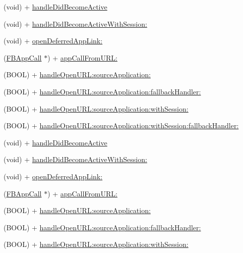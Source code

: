 \begin{DoxyCompactItemize}
\item 
(void) + \hyperlink{interfaceFBAppCall_ae38f6595e03e0ba2c44670e7ff579a70}{handle\+Did\+Become\+Active}
\item 
(void) + \hyperlink{interfaceFBAppCall_aa00467d180eab724577daeeb205524a4}{handle\+Did\+Become\+Active\+With\+Session\+:}
\item 
(void) + \hyperlink{interfaceFBAppCall_a02498c71e0be169b1ae49136d1446a23}{open\+Deferred\+App\+Link\+:}
\item 
(\hyperlink{interfaceFBAppCall}{F\+B\+App\+Call} $\ast$) + \hyperlink{interfaceFBAppCall_a03baee771317510fb167dad8926bc176}{app\+Call\+From\+U\+R\+L\+:}
\item 
(B\+O\+OL) + \hyperlink{interfaceFBAppCall_a199dea04bcd5f045d222a0c98901a3b9}{handle\+Open\+U\+R\+L\+:source\+Application\+:}
\item 
(B\+O\+OL) + \hyperlink{interfaceFBAppCall_ad685be8d03104cb8aa1f2b6ccf770d5d}{handle\+Open\+U\+R\+L\+:source\+Application\+:fallback\+Handler\+:}
\item 
(B\+O\+OL) + \hyperlink{interfaceFBAppCall_af20b1ba0f8f11d335d8ca28b2450cf9d}{handle\+Open\+U\+R\+L\+:source\+Application\+:with\+Session\+:}
\item 
(B\+O\+OL) + \hyperlink{interfaceFBAppCall_aab019d4dfc227c0a69627e9f666905ea}{handle\+Open\+U\+R\+L\+:source\+Application\+:with\+Session\+:fallback\+Handler\+:}
\item 
(void) + \hyperlink{interfaceFBAppCall_ae38f6595e03e0ba2c44670e7ff579a70}{handle\+Did\+Become\+Active}
\item 
(void) + \hyperlink{interfaceFBAppCall_aa00467d180eab724577daeeb205524a4}{handle\+Did\+Become\+Active\+With\+Session\+:}
\item 
(void) + \hyperlink{interfaceFBAppCall_a02498c71e0be169b1ae49136d1446a23}{open\+Deferred\+App\+Link\+:}
\item 
(\hyperlink{interfaceFBAppCall}{F\+B\+App\+Call} $\ast$) + \hyperlink{interfaceFBAppCall_a03baee771317510fb167dad8926bc176}{app\+Call\+From\+U\+R\+L\+:}
\item 
(B\+O\+OL) + \hyperlink{interfaceFBAppCall_a199dea04bcd5f045d222a0c98901a3b9}{handle\+Open\+U\+R\+L\+:source\+Application\+:}
\item 
(B\+O\+OL) + \hyperlink{interfaceFBAppCall_ad685be8d03104cb8aa1f2b6ccf770d5d}{handle\+Open\+U\+R\+L\+:source\+Application\+:fallback\+Handler\+:}
\item 
(B\+O\+OL) + \hyperlink{interfaceFBAppCall_af20b1ba0f8f11d335d8ca28b2450cf9d}{handle\+Open\+U\+R\+L\+:source\+Application\+:with\+Session\+:}

\end{DoxyCompactItemize}
